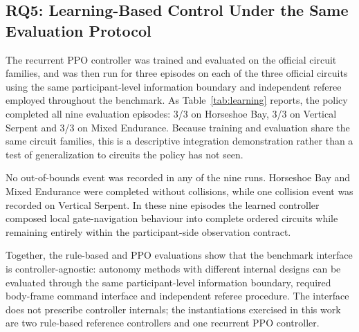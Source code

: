 \subsection{RQ5: Learning-Based Control Under the Same Evaluation Protocol}
\label{sec:eval_rq5}



The recurrent PPO controller was trained and evaluated on the official circuit
families, and was then run for three episodes on each of the three official
circuits using the same participant-level information boundary and independent
referee employed throughout the benchmark. As Table~\ref{tab:learning} reports,
the policy completed all nine evaluation episodes: 3/3 on Horseshoe Bay, 3/3 on
Vertical Serpent and 3/3 on Mixed Endurance. Because training and evaluation
share the same circuit families, this is a descriptive integration demonstration
rather than a test of generalization to circuits the policy has not seen.

No out-of-bounds event was recorded in any of the nine runs. Horseshoe Bay and
Mixed Endurance were completed without collisions, while one collision event was
recorded on Vertical Serpent. In these nine episodes the learned controller
composed local gate-navigation behaviour into complete ordered circuits while
remaining entirely within the participant-side observation contract.

Together, the rule-based and PPO evaluations show that the benchmark interface
is controller-agnostic: autonomy methods with different internal designs can be
evaluated through the same participant-level
information boundary, required body-frame command interface and independent
referee procedure. The interface does not prescribe controller internals; the
instantiations exercised in this work are two rule-based reference controllers
and one recurrent PPO controller.
